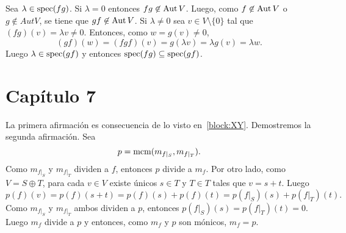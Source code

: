\begin{solution}[ejercicio~\ref{xca:spec(fg)=spec(gf)}]
    Sea $\lambda\in\operatorname{spec}(fg)$. Si $\lambda=0$ entonces $fg\not\in\operatorname{Aut} V$.
    Luego, como $f\not\in\operatorname{Aut} V$ o $g\not\in Aut V$, se tiene que
    $gf\not\in\operatorname{Aut} V$. Si $\lambda\ne0$ sea $v\in V\setminus\{0\}$ tal que
    $(fg)(v)=\lambda v\ne0$. Entonces, como $w=g(v)\ne0$, 
    \[
        (gf)(w)=(fgf)(v)=g(\lambda v)=\lambda g(v)=\lambda w.
    \]
    Luego $\lambda\in\operatorname{spec}(gf)$ y entonces $\operatorname{spec}(fg)\subseteq\operatorname{spec}(gf)$. 
\end{solution}
\section{Capítulo 7}

\begin{solution}
    La primera afirmación es consecuencia de lo visto en~\ref{block:XY}.
    Demostremos la segunda afirmación. Sea 
	\[
        p=\mathrm{mcm}(m_{f|_S},m_{f|_T}).
    \]
    Como $m_{f|_S}$ y $m_{f|_T}$ dividen a $f$, entonces $p$ divide a $m_f$.
    Por otro lado, como $V=S\oplus T$, para cada $v\in V$ existe únicos $s\in
    T$ y $T\in T$ tales que $v=s+t$. Luego
    \[
        p(f)(v)=p(f)(s+t)=p(f)(s)+p(f)(t)=p(f|_S)(s)+p(f|_T)(t).
    \]
    Como $m_{f|_S}$ y $m_{f|_T}$ ambos dividen a $p$, entonces
    $p(f|_S)(s)=p(f|_T)(t)=0$. Luego $m_f$ divide a $p$ y entonces, como $m_f$
    y $p$ son mónicos, $m_f=p$.
\end{solution}

